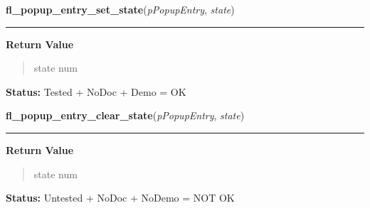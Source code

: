     \label{xformslib:library:fl_popup_entry_set_state}

    \vspace{0.5ex}

\hspace{.8\funcindent}\begin{boxedminipage}{\funcwidth}

    \raggedright \textbf{fl\_popup\_entry\_set\_state}(\textit{pPopupEntry}, \textit{state})

    \vspace{-1.5ex}

    \rule{\textwidth}{0.5\fboxrule}
\setlength{\parskip}{2ex}
\setlength{\parskip}{1ex}
      \textbf{Return Value}
    \vspace{-1ex}

      \begin{quote}
      state num

      \end{quote}

\textbf{Status:} Tested + NoDoc + Demo = OK



    \end{boxedminipage}

    \label{xformslib:library:fl_popup_entry_clear_state}

    \vspace{0.5ex}

\hspace{.8\funcindent}\begin{boxedminipage}{\funcwidth}

    \raggedright \textbf{fl\_popup\_entry\_clear\_state}(\textit{pPopupEntry}, \textit{state})

    \vspace{-1.5ex}

    \rule{\textwidth}{0.5\fboxrule}
\setlength{\parskip}{2ex}
\setlength{\parskip}{1ex}
      \textbf{Return Value}
    \vspace{-1ex}

      \begin{quote}
      state num

      \end{quote}

\textbf{Status:} Untested + NoDoc + NoDemo = NOT OK



    \end{boxedminipage}

